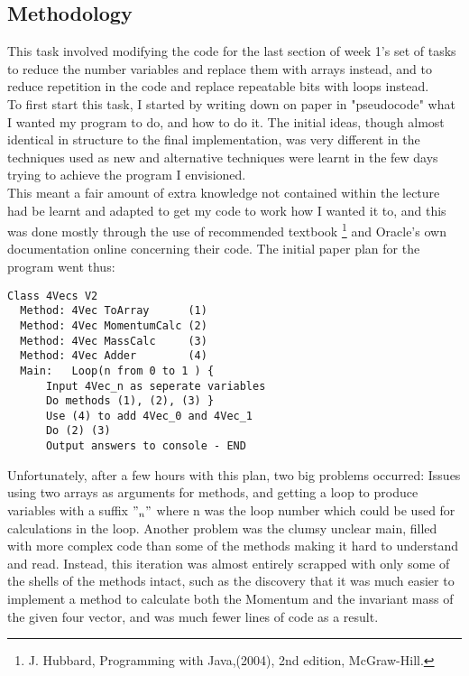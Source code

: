 \documentclass{article}
\begin{document}
\begin{multicols}{2}
			\subsection{Methodology}
		This task involved modifying the code for the last section of week 1's set of tasks to reduce the number variables and replace them with arrays instead, and to reduce repetition in the code and replace repeatable bits with loops instead. \\ \indent To first start this task, I started by writing down on paper in "pseudocode" what I wanted my program to do, and how to do it. The initial ideas, though almost identical in structure to the final implementation, was very different in the techniques used as new and alternative techniques were learnt in the few days trying to achieve the program I envisioned. \\ \indent This meant a fair amount of extra knowledge not contained within the lecture had be learnt and adapted to get my code to work how I wanted it to, and this was done mostly through the use of recommended textbook \footnote{J. Hubbard, Programming with Java,(2004), 2nd edition, McGraw-Hill. } and Oracle's own documentation online concerning their code. The initial paper plan for the program went thus:
		\begin{lstlisting}
Class 4Vecs V2
  Method: 4Vec ToArray      (1)
  Method: 4Vec MomentumCalc (2)
  Method: 4Vec MassCalc     (3)
  Method: 4Vec Adder        (4)
  Main:   Loop(n from 0 to 1 ) {
	  Input 4Vec_n as seperate variables
      Do methods (1), (2), (3) }
      Use (4) to add 4Vec_0 and 4Vec_1
      Do (2) (3)
      Output answers to console - END
		\end{lstlisting}
		Unfortunately, after a few hours with this plan, two big problems occurred: Issues using two arrays as arguments for methods, and getting a loop to produce variables with a suffix $"_ n"$ where n was the loop number which could be used for calculations in the loop. Another problem was the clumsy unclear main, filled with more complex code than some of the methods making it hard to understand and read. Instead, this iteration was almost entirely scrapped with only some of the shells of the methods intact, such as the discovery that it was much easier to implement a method to calculate both the Momentum and the invariant mass of the given four vector, and was much fewer lines of code as a result.
		

\end{multicols}
\end{document}
